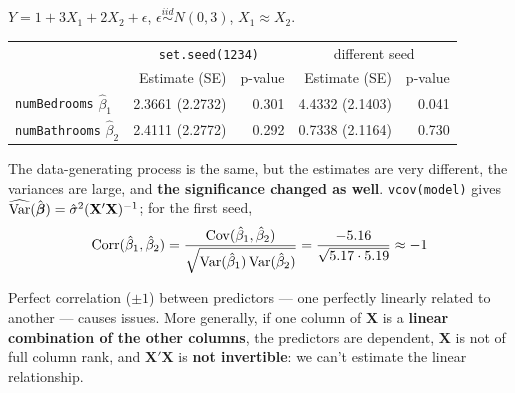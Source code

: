 \begin{example}
    $Y=1+3X_1+2X_2+\epsilon$, $\epsilon\overset{iid}\sim N(0,3)$, $X_1\approx X_2$.
    \begin{center}
        \begin{tabular}{lrrrr}
            \toprule
            & \multicolumn{2}{c}{\texttt{set.seed(1234)}} & \multicolumn{2}{c}{different seed} \\
            & Estimate (SE) & p-value & Estimate (SE) & p-value \\
            \midrule
            \texttt{numBedrooms} $\hat\beta_1$ & 2.3661 (2.2732) & 0.301 & 4.4332 (2.1403) & 0.041 \\
            \texttt{numBathrooms} $\hat\beta_2$ & 2.4111 (2.2772) & 0.292 & 0.7338 (2.1164) & 0.730 \\
            \bottomrule
        \end{tabular}
    \end{center}
    The data-generating process is the same, but the estimates are very different, the variances
    are large, and \textbf{the significance changed as well}. \texttt{vcov(model)} gives
    $\widehat{\operatorname{Var}}(\hat{\boldsymbol\beta})=\hat\sigma^2(\mathbf{X}'\mathbf{X})^{-1}$; for the first seed,
    \[\mathrm{Corr}(\hat\beta_1,\hat\beta_2)=\frac{\operatorname{Cov}(\hat\beta_1,\hat\beta_2)}{\sqrt{\operatorname{Var}(\hat\beta_1)\operatorname{Var}(\hat\beta_2)}}
    =\frac{-5.16}{\sqrt{5.17\cdot5.19}}\approx-1\]
\end{example}

\begin{definition}
    Perfect correlation ($\pm1$) between predictors --- one perfectly linearly related to another
    --- causes issues. More generally, if one column of $\mathbf{X}$ is a \textbf{linear
    combination of the other columns}, the predictors are dependent, $\mathbf{X}$ is not of full
    column rank, and $\mathbf{X}'\mathbf{X}$ is \textbf{not invertible}: we can't estimate the
    linear relationship.
\end{definition}

